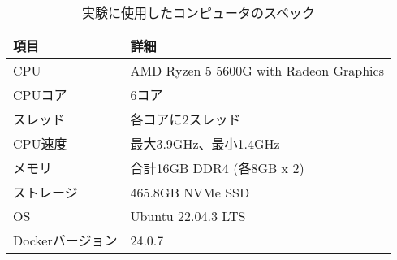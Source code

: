 \documentclass[../../../../main]{subfiles}
\begin{document}
    \begin{table}[htbp]
        \centering
        \begin{tabular}{|l|l|}
            \hline
            \textbf{項目} & \textbf{詳細}                            \\ \hline
            CPU         & AMD Ryzen 5 5600G with Radeon Graphics \\ \hline
            CPUコア       & 6コア                                    \\ \hline
            スレッド        & 各コアに2スレッド                              \\ \hline
            CPU速度       & 最大3.9GHz、最小1.4GHz                      \\ \hline
            メモリ         & 合計16GB DDR4 (各8GB x 2)                 \\ \hline
            ストレージ       & 465.8GB NVMe SSD                       \\ \hline
            OS          & Ubuntu 22.04.3 LTS                     \\ \hline
            Dockerバージョン & 24.0.7                                 \\ \hline
        \end{tabular}
        \caption{実験に使用したコンピュータのスペック}
        \label{tab:computer-specs}
    \end{table}
\end{document}
